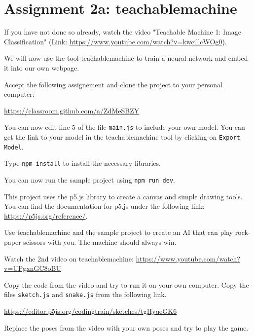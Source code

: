 \documentclass[12pt,a4paper]{report}
\begin{document}
\section*{Assignment 2a: teachablemachine}

\begin{ex}
    If you have not done so already, watch the video "Teachable Machine 1: Image Classification" (Link: \url{https://www.youtube.com/watch?v=kwcillcWOg0}).
\end{ex}

We will now use the tool teachablemachine to train a neural network and embed it into our own webpage.

\begin{ex}
    Accept the following assignement and clone the project to your personal computer:
    
    \url{https://classroom.github.com/a/ZdMeSBZY}

    You can now edit line 5 of the file \verb|main.js| to include your own model. You can get the link to your model in the teachablemachine tool by clicking on \verb|Export Model|.

    Type \verb|npm install| to install the necessary libraries.

   You can now run the sample project using \verb|npm run dev|.

   This project uses the p5.js library to create a canvas and simple drawing tools. You can find the documentation for p5.js under the following link: \url{https://p5js.org/reference/}.
\end{ex}

\begin{ex}
    Use teachablemachine and the sample project to create an AI that can play rock-paper-scissors with you. The machine should always win.
\end{ex}

\begin{ex}
     Watch the 2nd video on teachablemachine: \url{https://www.youtube.com/watch?v=UPgxnGC8oBU}
\end{ex}

\begin{ex}
     Copy the code from the video and try to run it on your own computer. Copy the files \verb|sketch.js| and \verb|snake.js| from the following link.

     \url{https://editor.p5js.org/codingtrain/sketches/tgHyqeGK6}
\end{ex}

\begin{ex}
     Replace the poses from the video with your own poses and try to play the game.
\end{ex}
\end{document}

